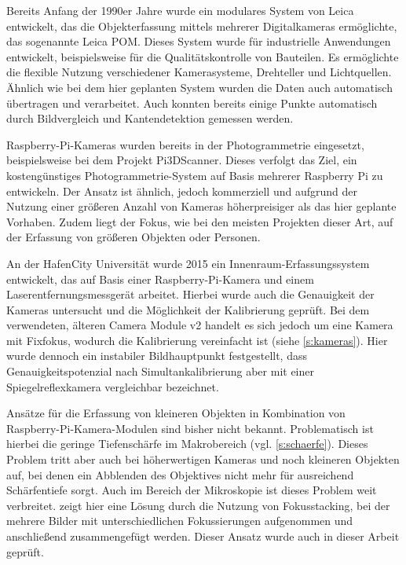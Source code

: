 \documentclass[./00PhotoBox]{subfiles}
\begin{document}
Bereits Anfang der 1990er Jahre wurde ein modulares System von Leica entwickelt, das die Objekterfassung mittels mehrerer Digitalkameras ermöglichte, das sogenannte Leica POM. Dieses System wurde für industrielle Anwendungen entwickelt, beispielsweise für die Qualitätskontrolle von Bauteilen. Es ermöglichte die flexible Nutzung verschiedener Kamerasysteme, Drehteller und Lichtquellen. Ähnlich wie bei dem hier geplanten System wurden die Daten auch automatisch übertragen und verarbeitet. Auch konnten bereits einige Punkte automatisch durch Bildvergleich und Kantendetektion gemessen werden.
\citep{leica_pom_concept}

Raspberry-Pi-Kameras wurden bereits in der Photogrammetrie eingesetzt, beispielsweise bei dem Projekt Pi3DScanner. Dieses verfolgt das Ziel, ein kostengünstiges Photo\-grammetrie-System auf Basis mehrerer Raspberry Pi zu entwickeln. Der Ansatz ist ähnlich, jedoch kommerziell und aufgrund der Nutzung einer größeren Anzahl von Kameras höherpreisiger als das hier geplante Vorhaben. Zudem liegt der Fokus, wie bei den meisten Projekten dieser Art, auf der Erfassung von größeren Objekten oder Personen.
\citep{pi3dscanner}

An der HafenCity Universität wurde 2015 ein Innenraum-Erfassungssystem entwickelt, das auf Basis einer Raspberry-Pi-Kamera und einem Laserentfernungsmessgerät arbeitet. Hierbei wurde auch die Genauigkeit der Kameras untersucht und die Möglichkeit der Kalibrierung geprüft. Bei dem verwendeten, älteren Camera Module v2 handelt es sich jedoch um eine Kamera mit Fixfokus, wodurch die Kalibrierung vereinfacht ist (siehe \autoref{s:kameras}). Hier wurde dennoch ein instabiler \Gls{Bildhauptpunkt} festgestellt, dass Genauigkeitspotenzial nach Simultankalibrierung aber mit einer Spiegelreflexkamera vergleichbar bezeichnet.
\citep{3d_raspi_laserscanner}

Ansätze für die Erfassung von kleineren Objekten in Kombination von Raspberry-Pi-Kamera-Modulen sind bisher nicht bekannt. Problematisch ist hierbei die geringe Tiefenschärfe im Makrobereich (vgl. \autoref{s:schaerfe}). Dieses Problem tritt aber auch bei höherwertigen Kameras und noch kleineren Objekten auf, bei denen ein Abblenden des Objektives nicht mehr für ausreichend Schärfentiefe sorgt. Auch im Bereich der Mikroskopie ist dieses Problem weit verbreitet. \cite{focusstack_sfm} zeigt hier eine Lösung durch die Nutzung von Fokusstacking, bei der mehrere Bilder mit unterschiedlichen Fokussierungen aufgenommen und anschließend zusammengefügt werden. Dieser Ansatz wurde auch in dieser Arbeit geprüft.
\end{document}
